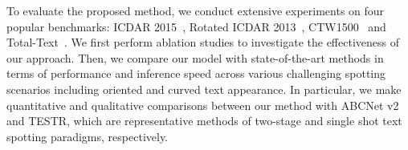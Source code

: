 To evaluate the proposed method, we conduct extensive experiments on four popular benchmarks: ICDAR 2015~\cite{karatzas2015icdar}, Rotated ICDAR 2013~\cite{karatzas2013icdar}, CTW1500~\cite{liu2019curved} and Total-Text~\cite{ch2017total}. We first perform ablation studies to investigate the effectiveness of our approach. Then, we compare our model with state-of-the-art methods in terms of performance and inference speed across various challenging spotting scenarios including oriented and curved text appearance. In particular, we make quantitative and qualitative comparisons between our method with ABCNet v2 and TESTR, which are representative methods of two-stage and single shot text spotting paradigms, respectively. 


\begin{comment}
\begin{table*}[!t]
\renewcommand{\arraystretch}{1.1}
  \caption{Comparison between \textbf{SRSTS} and \textbf{SRSTS v2} by Ablation study on CTW1500 and Total-Text. `Sampling-based': the text detection is performed based on the sampled points by the sampling module in \textbf{SRSTS v2}. `DTE': the deformable transformer encoder is employed in Feature Extractor. `SA': self-attention operation is used in Recognition Head of \textbf{SRSTS v2} to capture the long-range dependencies among sampled points. `P’, `R’, `F’ represent `Precision', `Recall' and `F-measure' respectively. `None' and `Full' are two metrics for measuring the end-to-end performance in terms of F-measure. `None’ represents the performance without using lexicon while ‘Full’ corresponds the performance using the lexicon containing all words appearing in the test set.}
  \label{tab:ablative}
  \centering
\begin{tabular}{l|ccc|ccccc|cccccc}
    \toprule
\multirow{3}{*}{Method} & \multicolumn{3}{c|}{\multirow{2}{*}{Model Components}} &\multicolumn{5}{c|}{CTW1500} & \multicolumn{6}{c}{Total-Text}\\
    \cmidrule(lr){5-9}
    \cmidrule(lr){10-15}
& & & &\multicolumn{3}{c}{Detection} & \multicolumn{2}{c|}{E2E}&\multicolumn{3}{c}{Detection} & \multicolumn{2}{c}{E2E}  &\multirow{2}*{FPS }\\
    \cmidrule(lr){2-4}
    \cmidrule(lr){5-7}
    \cmidrule(lr){8-9}
    \cmidrule(lr){10-12}
    \cmidrule(lr){13-14}
&Sampling-based & DTE & SA& P&R&F& None &Full& P&R&F& None &Full& \\
\midrule
SRSTS~\cite{wu2022decoupling} & & &  & 88.92&83.30 &86.02 &55.59 &78.06 &91.99 & 82.96 &87.24&78.80& 86.33&18.74  \\

\end{comment}
